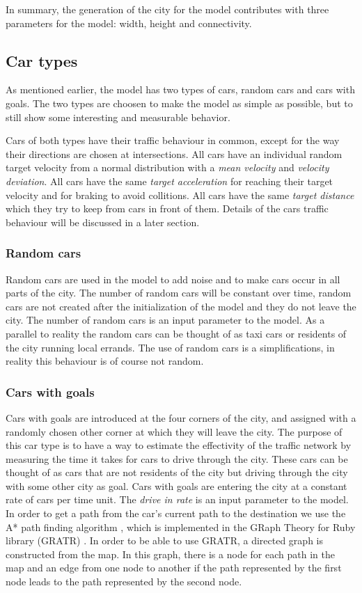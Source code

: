 \documentclass[11pt,a4paper]{article}
\begin{document}
In summary, the generation of the city for the model contributes with three parameters for the model: width, height and connectivity.
\subsection{Car types}
As mentioned earlier, the model has two types of cars, random cars and cars with goals. The two types are choosen to make the model as simple as possible, but to still show some interesting and measurable behavior.

Cars of both types have their traffic behaviour in common, except for the way their directions are chosen at intersections. All cars have an individual random target velocity from a normal distribution with a \textit{mean velocity} and \textit{velocity deviation}. All cars have the same \textit{target acceleration} for reaching their target velocity and for braking to avoid collitions. All cars have the same \textit{target distance} which they try to keep from cars in front of them. Details of the cars traffic behaviour will be discussed in a later section.
\subsubsection{Random cars}
Random cars are used in the model to add noise and to make cars occur in all parts of the city. The number of random cars will be constant over time, random cars are not created after the initialization of the model and they do not leave the city. The number of random cars is an input parameter to the model. As a parallel to reality the random cars can be thought of as taxi cars or residents of the city running local errands. The use of random cars is a simplifications, in reality this behaviour is of course not random.
\subsubsection{Cars with goals}
Cars with goals are introduced at the four corners of the city, and assigned with a randomly chosen other corner at which they will leave the city. The purpose of this car type is to have a way to estimate the effectivity of the traffic network by measuring the time it takes for cars to drive through the city. These cars can be thought of as cars that are not residents of the city but driving through the city with some other city as goal. Cars with goals are entering the city at a constant rate of cars per time unit. The \textit{drive in rate} is an input parameter to the model.
In order to get a path from the car's current path to the destination we use the
A* path finding algorithm \cite{astar}, which is implemented in the GRaph Theory
for Ruby library (GRATR) \cite{gratr}. In order to be able to use GRATR, a
directed graph is constructed from the map. In this graph, there is a node for
each path in the map and an edge from one node to another if the path
represented by the first node leads to the path represented by the second node.
\end{document}
